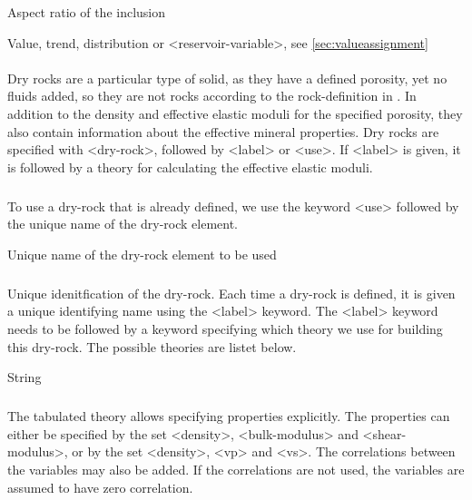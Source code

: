 {
 \slist
   \item \Description Aspect ratio of the inclusion
   \item \Argument Value, trend, distribution or <reservoir-variable>, see \autoref{sec:valueassignment}
   \item \Default
 \elist

\paragraph{}
 \slist
   \item \Description Dry rocks are a particular type of solid, as they have a defined porosity, yet no fluids added, so they are not rocks according to the rock-definition in . In addition to the density and effective elastic moduli for the specified porosity, they also contain information about the effective mineral properties.
Dry rocks are specified with <dry-rock>, followed by <label> or <use>. If <label> is given, it is followed by a theory for calculating the effective elastic moduli.
   \item \Argument
   \item \Default
 \elist

\subparagraph{}
 \slist
   \item \Description  To use a dry-rock that is already defined, we use the keyword <use> followed by the unique name of the dry-rock element.
   \item \Argument Unique name of the dry-rock element to be used
   \item \Default
 \elist

\subparagraph{}
 \slist
   \item \Description Unique idenitfication of the dry-rock. Each time a dry-rock is defined, it is given a unique identifying name using
the <label> keyword. The <label> keyword needs to be followed by a keyword specifying which theory we use for building this dry-rock. The possible theories are listet below.
   \item \Argument String
   \item \Default
 \elist

\subparagraph{}
 \slist
   \item \Description The tabulated theory allows specifying properties explicitly. The properties can either be specified by the set <density>, <bulk-modulus> and <shear-modulus>, or by the set <density>, <vp> and <vs>. The correlations between the variables may also be added. If the correlations are not used, the variables are assumed to have zero correlation.
   \item \Argument
   \item \Default
 \elist

}
